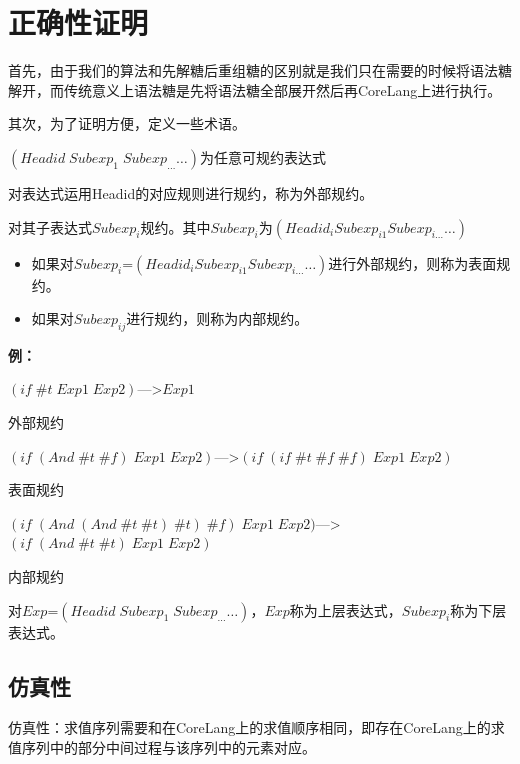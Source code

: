 \section{正确性证明}

首先，由于我们的算法和先解糖后重组糖的区别就是我们只在需要的时候将语法糖解开，而传统意义上语法糖是先将语法糖全部展开然后再CoreLang上进行执行。

其次，为了证明方便，定义一些术语。

$(Headid\;Subexp_{1}\;Subexp_{\ldots} \ldots)$为任意可规约表达式

对表达式运用Headid的对应规则进行规约，称为外部规约。

对其子表达式$Subexp_{i}$规约。其中$Subexp_{i}$为$(Headid_{i} Subexp_{i1} Subexp_{i\ldots} \ldots)$
\begin{itemize}
	\item 如果对$Subexp_{i}$=$(Headid_{i} Subexp_{i1} Subexp_{i\ldots} \ldots)$进行外部规约，则称为表面规约。
	\item 如果对$Subexp_{ij}$进行规约，则称为内部规约。
\end{itemize}

{\bfseries 例：}

$(if\; \#t\; Exp1\; Exp2)$--->$Exp1$ \begin{flushright}外部规约\end{flushright}

$(if\; (And\; \#t\; \#f)\; Exp1\; Exp2)$--->$(if\; (if\; \#t\; \#f\; \#f)\; Exp1\; Exp2)$ \begin{flushright}表面规约\end{flushright}

$(if\; (And\; (And\; \#t\; \#t)\; \#t)\; \#f)\; Exp1\; Exp2)$--->$(if\; (And\; \#t\; \#t)\; Exp1\; Exp2)$ \begin{flushright}内部规约\end{flushright}

对$Exp$=$(Headid\;Subexp_{1}\;Subexp_{\ldots} \ldots)$，$Exp$称为上层表达式，$Subexp_{i}$称为下层表达式。

\subsection{仿真性}
仿真性：求值序列需要和在CoreLang上的求值顺序相同，即存在CoreLang上的求值序列中的部分中间过程与该序列中的元素对应。

